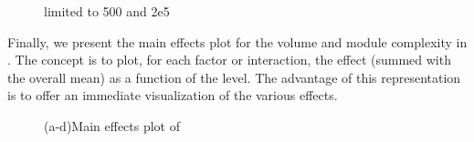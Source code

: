 \begin{figure}
    \hfill
    \hspace*{\fill}
    \caption{limited to 500 and 2e5}
    \label{fig:05_doe}
\end{figure}

Finally, we present the main effects plot for the volume and module complexity in . The concept is to plot, for each factor or interaction, the effect (summed with the overall mean) as a function of the level. The advantage of this representation is to offer an immediate visualization of the various effects.
\begin{figure}
    \centering
    \bigskip
    \caption{(a-d)Main effects plot of }
    \label{fig:05_doe_main_eff}
\end{figure}
